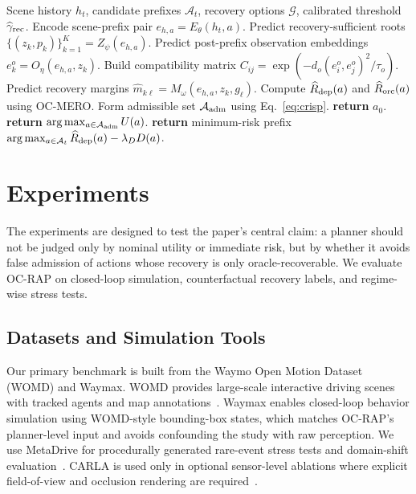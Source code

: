 \documentclass[conference]{IEEEtran}
\begin{document}
\begin{algorithm}[t]
\caption{Observation-Consistent Recovery-Affordance Planning}
\label{alg:ocrap}
\begin{algorithmic}[1]
\REQUIRE Scene history $h_t$, candidate prefixes $\mathcal{A}_t$, recovery options $\mathcal{G}$, calibrated threshold $\widehat\gamma_{\rm rec}$.
    \STATE Encode scene-prefix pair $e_{h,a}=E_\theta(h_t,a)$.
    \STATE Predict recovery-sufficient roots $\{(z_k,p_k)\}_{k=1}^{K}=Z_\psi(e_{h,a})$.
    \STATE Predict post-prefix observation embeddings $e_k^o=O_\eta(e_{h,a},z_k)$.
    \STATE Build compatibility matrix $C_{ij}=\exp(-d_o(e_i^o,e_j^o)^2/\tau_o)$.
    \STATE Predict recovery margins $\hat m_{k\ell}=M_\omega(e_{h,a},z_k,g_\ell)$.
    \STATE Compute $\widehat R_{\rm dep}(a)$ and $\widehat R_{\rm orc}(a)$ using OC-MERO.
\ENDFOR
\STATE Form admissible set $\mathcal{A}_{\rm adm}$ using Eq.~\eqref{eq:crisp}.
    \STATE \textbf{return} $a_0$.
    \STATE \textbf{return} $\arg\max_{a\in\mathcal{A}_{\rm adm}} U(a)$.
\ELSE
    \STATE \textbf{return} minimum-risk prefix $\arg\max_{a\in\mathcal{A}_t}\widehat R_{\rm dep}(a)-\lambda_DD(a)$.
\ENDIF
\end{algorithmic}
\end{algorithm}


\section{Experiments}
\label{sec:experiments}

The experiments are designed to test the paper's central claim: a planner should not be judged only by nominal utility or immediate risk, but by whether it avoids false admission of actions whose recovery is only oracle-recoverable.  We evaluate OC-RAP on closed-loop simulation, counterfactual recovery labels, and regime-wise stress tests.

\subsection{Datasets and Simulation Tools}
\label{subsec:exp_data}

Our primary benchmark is built from the Waymo Open Motion Dataset (WOMD) and Waymax.  WOMD provides large-scale interactive driving scenes with tracked agents and map annotations~\cite{ettinger2021large}.  Waymax enables closed-loop behavior simulation using WOMD-style bounding-box states, which matches OC-RAP's planner-level input and avoids confounding the study with raw perception.  We use MetaDrive for procedurally generated rare-event stress tests and domain-shift evaluation~\cite{li2022metadrive}.  CARLA is used only in optional sensor-level ablations where explicit field-of-view and occlusion rendering are required~\cite{dosovitskiy2017carla}.
\end{document}
